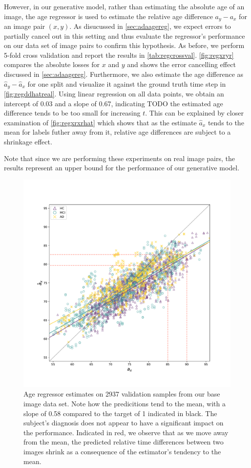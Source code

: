 However, in our generative model, rather than estimating the absolute age of an image, the age regressor is used to estimate the relative age difference $a_y - a_x$ for an image pair $(x, y)$. As disucussed in \autoref{sec:adaagereg}, we expect errors to partially cancel out in this setting and thus evaluate the regressor's performance on our data set of image pairs to confirm this hypothesis. As before, we perform 5-fold cross validation and report the results in \autoref{tab:regcrossval}. \autoref{fig:regxryr} compares the absolute losses for $x$ and $y$ and shows the error cancelling effect discussed in \autoref{sec:adaagereg}. Furthermore, we also estimate the age difference as $\hat a_y - \hat a_x$ for one split and visualize it against the ground truth time step in \autoref{fig:regddhatreal}. Using linear regression on all data points, we obtain an intercept of 0.03 and a slope of 0.67, indicating TODO the estimated age difference tends to be too small for increasing $t$. This can be explained by closer examination of \autoref{fig:regxrxrhat} which shows that as the estimate $\hat a_x$ tends to the mean for labels futher away from it, relative age differences are subject to a shrinkage effect. 

Note that since we are performing these experiments on real image pairs, the results represent an upper bound for the performance of our generative model.

\begin{figure}
	\centering
	\includegraphics[width=.8\linewidth]{images/age_plots/xr_xrhat} 
	\vspace*{-15pt}
	\caption{Age regressor estimates on 2937 validation samples from our base image data set. Note how the predicitions tend to the mean, with a slope of 0.58 compared to the target of 1 indicated in black. The subject's diagnosis does not appear to have a significant impact on the performance. Indicated in red, we observe that as we move away from the mean, the predicted relative time differences between two images shrink as a consequence of the estimator's tendency to the mean.}
	\label{fig:regxrxrhat}
\end{figure}

